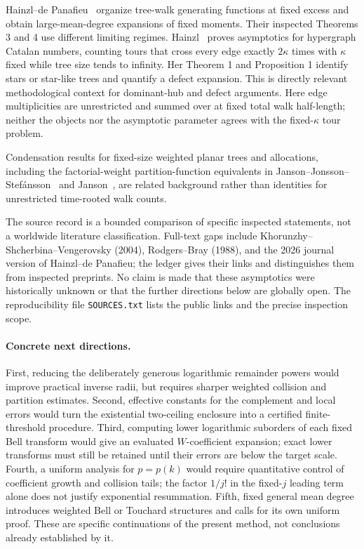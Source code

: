\documentclass[11pt,letterpaper]{article}
\theoremstyle{remark}\newtheorem{remark}[theorem]{Remark}
\theoremstyle{definition}\newtheorem{definition}[theorem]{Definition}
\begin{document}
Hainzl--de Panafieu~\cite{hdp} organize tree-walk generating functions at fixed excess and obtain large-mean-degree expansions of fixed moments. Their inspected Theorems 3 and 4 use different limiting regimes. Hainzl~\cite{hainzl} proves asymptotics for hypergraph Catalan numbers, counting tours that cross every edge exactly $2\kappa$ times with $\kappa$ fixed while tree size tends to infinity. Her Theorem 1 and Proposition 1 identify stars or star-like trees and quantify a defect expansion. This is directly relevant methodological context for dominant-hub and defect arguments. Here edge multiplicities are unrestricted and summed over at fixed total walk half-length; neither the objects nor the asymptotic parameter agrees with the fixed-$\kappa$ tour problem.

Condensation results for fixed-size weighted planar trees and allocations, including the factorial-weight partition-function equivalents in Janson--Jonsson--Stef\'ansson~\cite{jjs} and Janson~\cite{janson}, are related background rather than identities for unrestricted time-rooted walk counts.

The source record is a bounded comparison of specific inspected statements, not a worldwide literature classification. Full-text gaps include Khorunzhy--Shcherbina--Vengerovsky (2004), Rodgers--Bray (1988), and the 2026 journal version of Hainzl--de Panafieu; the ledger gives their links and distinguishes them from inspected preprints. No claim is made that these asymptotics were historically unknown or that the further directions below are globally open. The reproducibility file \texttt{SOURCES.txt} lists the public links and the precise inspection scope.

\paragraph{Concrete next directions.}
First, reducing the deliberately generous logarithmic remainder powers would improve practical inverse radii, but requires sharper weighted collision and partition estimates. Second, effective constants for the complement and local errors would turn the existential two-ceiling enclosure into a certified finite-threshold procedure. Third, computing lower logarithmic suborders of each fixed Bell transform would give an evaluated $W$-coefficient expansion; exact lower transforms must still be retained until their errors are below the target scale. Fourth, a uniform analysis for $p=p(k)$ would require quantitative control of coefficient growth and collision tails; the factor $1/j!$ in the fixed-$j$ leading term alone does not justify exponential resummation. Fifth, fixed general mean degree introduces weighted Bell or Touchard structures and calls for its own uniform proof. These are specific continuations of the present method, not conclusions already established by it.
\end{document}
